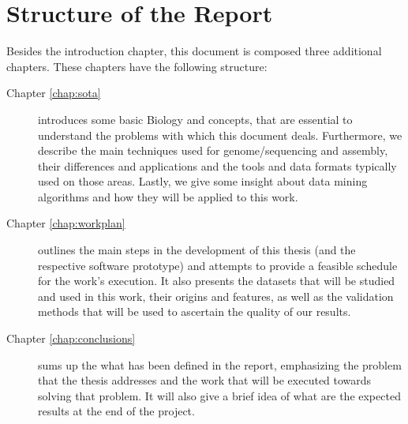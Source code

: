 \section{Structure of the Report} \label{sec:outline}

Besides the introduction chapter, this document is composed three additional
chapters. These chapters have the following structure:

\begin{description}

  \item[Chapter \ref{chap:sota}]
  introduces some basic Biology and \rnaseq{} concepts, that are essential to
  understand the problems with which this document deals. Furthermore, we
  describe the main techniques used for genome/\trans sequencing and assembly,
  their differences and applications and the tools and data formats typically
  used on those areas. Lastly, we give some insight about data mining algorithms
  and how they will be applied to this work.

  \item[Chapter \ref{chap:workplan}]
  outlines the main steps in the development of this thesis (and the respective
  software prototype) and attempts to provide a feasible schedule for the work's
  execution. It also presents the datasets that will be studied and used in this
  work, their origins and features, as well as the validation methods that will
  be used to ascertain the quality of our results.

  \item[Chapter \ref{chap:conclusions}]
  sums up the what has been defined in the report, emphasizing the problem that
  the thesis addresses and the work that will be executed towards solving that
  problem. It will also give a brief idea of what are the expected results at
  the end of the project.

\end{description}
